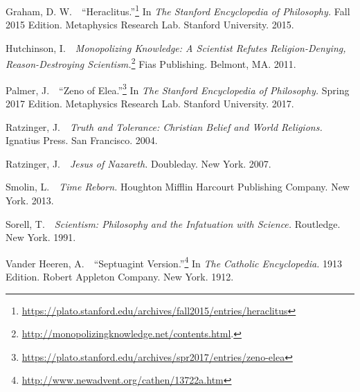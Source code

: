 \documentclass[twocolumn]{article}
\begin{document}
\begin{thebibliography}{}
\begin{small}
      Graham, D. W.\ \ ``Heraclitus.''\footnote{%
         \url{https://plato.stanford.edu/archives/fall2015/entries/heraclitus}
      }
      In {\it The Stanford Encyclopedia of Philosophy.}  Fall 2015 Edition.
      Metaphysics Research Lab.  Stanford University.  2015.

      Hutchinson, I.\ \ {\it Monopolizing Knowledge: A Scientist Refutes
      Religion-Denying, Reason-Destroying Scientism.}\footnote{%
         \url{http://monopolizingknowledge.net/contents.html}.%
      }
      Fias Publishing.  Belmont, MA.  2011.

      Palmer, J.\ \ ``Zeno of Elea.''\footnote{%
         \url{https://plato.stanford.edu/archives/spr2017/entries/zeno-elea}%
      }
      In {\it The Stanford Encyclopedia of Philosophy.}  Spring 2017 Edition.
      Metaphysics Research Lab.  Stanford University.  2017.

      Ratzinger, J.\ \ {\it Truth and Tolerance: Christian Belief and World
      Religions.}  Ignatius Press.  San Francisco.  2004.

      Ratzinger, J.\ \ {\it Jesus of Nazareth.}  Doubleday.  New York.  2007.

      Smolin, L.\ \ {\it Time Reborn.}  Houghton Mifflin Harcourt Publishing
      Company.  New York.  2013.

      Sorell, T.\ \ {\it Scientism: Philosophy and the Infatuation with
      Science.}  Routledge.  New York.  1991.

      Vander Heeren, A.\ \ ``Septuagint Version.''\footnote{%
         \url{http://www.newadvent.org/cathen/13722a.htm}%
      }
      In {\it The Catholic Encyclopedia.}  1913 Edition.  Robert Appleton
      Company.  New York.  1912.

   \end{small}

\end{thebibliography}

\onecolumn


\end{document}

